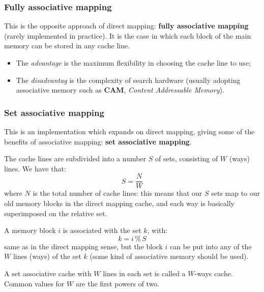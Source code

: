 \documentclass[a4paper,11pt]{article}
\begin{document}
\subsubsection{Fully associative mapping}

This is the opposite approach of direct mapping: \textbf{fully associative mapping} (rarely implemented in practice).
It is the case in which each block of the main memory can be stored in
any cache line.
\begin{itemize}
	\item The \textit{advantage} is the maximum flexibility in choosing the cache line to use;
	\item The \textit{disadvantag} is the complexity of search hardware (usually adopting associative memory such as \textbf{CAM}, \textit{Content Addressable Memory}).
\end{itemize}

\subsubsection{Set associative mapping}

This is an implementation which expands on direct mapping, giving some of the benefits of associative mapping: \textbf{set associative mapping}.

The cache lines are subdivided into a number $S$ of sets, consisting of $W$ (ways) lines.
We have that:
$$
	S = \frac{N}{W}
$$
where $N$ is the total number of cache lines: this means that our $S$ sets map to our old memory blocks in the direct mapping cache, and each way is basically superimposed on the relative set.

A memory block $i$ is associated with the set $k$, with:
$$
	k = i \, \% \, S
$$
same as in the direct mapping sense, but the block $i$ can be put into any of the $W$ lines (ways) of the set $k$ (some kind of associative memory should be used).

A set associative cache with $W$ lines in each set is called a $W$-ways cache.
Common values for $W$ are the first powers of two.

\par\smallskip
\end{document}
